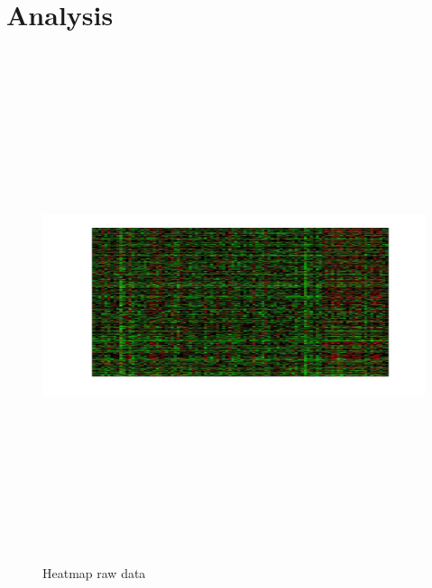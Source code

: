 \section{Analysis}

\begin{figure}[htbp]
	\centering
	\includegraphics[width=\linewidth,height=15cm,keepaspectratio]{analisis/raw.jpg}
	\caption{Heatmap raw data}
	\label{pic:raw}
\end{figure}

